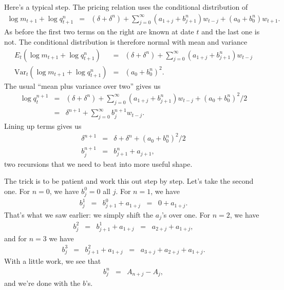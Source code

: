 \documentclass[11pt]{article}
\begin{document}
Here's a typical step.
The pricing relation uses the conditional distribution of
\begin{eqnarray*}
    \log m_{t+1} + \log q^n_{t+1} &=&  (\delta + \delta^n)
                + \sum_{j=0}^\infty (a_{1+j} + b^n_{j+1}) w_{t-j}
                + (a_0 + b^n_0) w_{t+1} .
\end{eqnarray*}
As before the first two terms on the right are known at date $t$
and the last one is not.
The conditional distribution is therefore normal with mean and variance
\begin{eqnarray*}
  E_t (  \log m_{t+1} + \log q^n_{t+1})  &=&  (\delta + \delta^n)
                + \sum_{j=0}^\infty (a_{1+j} + b^n_{j+1}) w_{t-j} \\
  \mbox{Var}_t (  \log m_{t+1} + \log q^n_{t+1})
                &=&  (a_0 + b^n_0)^2  .
\end{eqnarray*}
The usual ``mean plus variance over two'' gives us
\begin{eqnarray*}
  \log q^{n+1}_t  &=&  (\delta + \delta^n)
                + \sum_{j=0}^\infty (a_{1+j} + b^n_{j+1}) w_{t-j} +
             (a_0 + b^n_0)^2 / 2 \\
                &=& \delta^{n+1} + \sum_{j=0}^\infty b^{n+1}_{j} w_{t-j} .
\end{eqnarray*}
Lining up terms gives us
\begin{eqnarray*}
    \delta^{n+1} &=& \delta + \delta^n + (a_0 + b_0^n)^2/2\\
    b_j^{n+1} &=& b_{j+1}^{n} + a_{j+1} ,
\end{eqnarray*}
two recursions that we need to beat into more useful shape.

The trick is to be patient and work this out step by step.
Let's take the second one.
For $n = 0$,  we have $b^0_j = 0$ all $j$.
For $n=1$, we have
\begin{eqnarray*}
    b^1_j &=& b^0_{j+1} + a_{1+j}
            \;\;=\;\; 0 + a_{1+j}.
\end{eqnarray*}
That's what we saw earlier:  we simply shift the $a_j$'s over one.
For $n=2$, we have
\begin{eqnarray*}
    b^2_j &=& b^1_{j+1} + a_{1+j}
            \;\;=\;\; a_{2+j} + a_{1+j} ,
\end{eqnarray*}
and for $n=3$ we have
\begin{eqnarray*}
    b^3_j &=& b^2_{j+1} + a_{1+j}
            \;\;=\;\; a_{3+j} + a_{2+j} + a_{1+j} .
\end{eqnarray*}
With a little work, we see that
\begin{eqnarray*}
    b^n_j &=& A_{n+j} - A_j  ,
\end{eqnarray*}
and we're done with the $b$'s.
\end{document}
